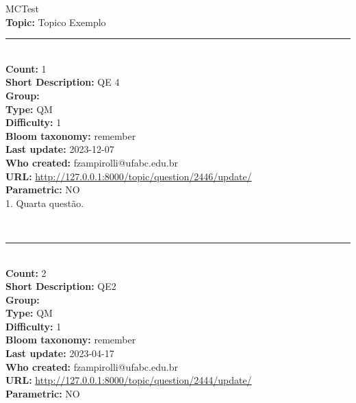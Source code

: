 \documentclass[10pt,brazil,a4paper]{exam}
\begin{document}
\noindent\Huge{MCTest}\normalsize\vspace{5mm}\\
\noindent\textbf{Topic:} Topico Exemplo\\
\noindent\rule{\textwidth}{0.8pt}\\
\noindent\textbf{Count:} 1\\
\noindent\textbf{Short Description:} QE 4\\
\noindent\textbf{Group:} \\
\noindent\textbf{Type:} QM\\
\noindent\textbf{Difficulty:} 1\\
\noindent\textbf{Bloom taxonomy:} remember\\
\noindent\textbf{Last update:} 2023-12-07\\
\noindent\textbf{Who created:} fzampirolli@ufabc.edu.br\\
\noindent\textbf{URL:} \url{http://127.0.0.1:8000/topic/question/2446/update/}\\
\noindent\textbf{Parametric:} NO\\

 \hspace{-1mm} 1. Quarta questão.
\n\n

\vspace{2mm}\begin{oneparchoices}\hspace{-3mm}
\end{oneparchoices}\vspace{0mm}\\
\noindent\rule{\textwidth}{0.8pt}\\
\noindent\textbf{Count:} 2\\
\noindent\textbf{Short Description:} QE2\\
\noindent\textbf{Group:} \\
\noindent\textbf{Type:} QM\\
\noindent\textbf{Difficulty:} 1\\
\noindent\textbf{Bloom taxonomy:} remember\\
\noindent\textbf{Last update:} 2023-04-17\\
\noindent\textbf{Who created:} fzampirolli@ufabc.edu.br\\
\noindent\textbf{URL:} \url{http://127.0.0.1:8000/topic/question/2444/update/}\\
\noindent\textbf{Parametric:} NO\\
\end{document}
